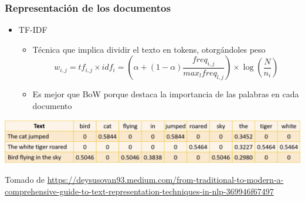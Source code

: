 \documentclass[
10pt, %
aspectratio=169, %
]{beamer}
\begin{document}
	\begin{frame}
		
		\frametitle{Representación de los documentos}
		
		\begin{itemize}
			\item TF-IDF
			
				\begin{itemize}
				\item Técnica que implica dividir el texto en tokens, otorgándoles peso
				$$w_{i,j} = tf_{i, j} \times idf_i =(\alpha + (1 - \alpha) \frac{freq_{i,j}}{max_l freq_{l, j}}) \times \log(\frac{N}{n_i}) $$
				
				\pause
				\item Es mejor que BoW porque destaca la importancia de las palabras en cada documento	
			\end{itemize}
			
		\end{itemize}
		
		\pause
		\vspace{2\baselineskip}
		
		\centering
		\includegraphics[scale=0.3]{tf-idf.png}
		
		{\scriptsize Tomado de \url{https://deysusovan93.medium.com/from-traditional-to-modern-a-comprehensive-guide-to-text-representation-techniques-in-nlp-369946f67497}}
		
	\end{frame}
	
	
\end{document}
